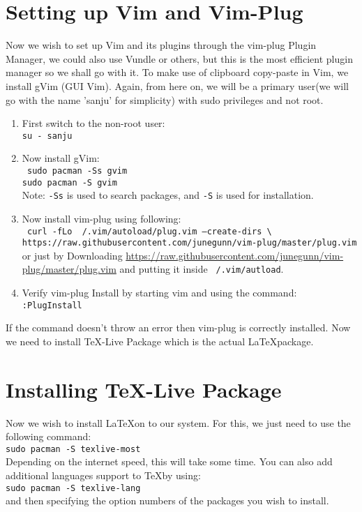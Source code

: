 \documentclass[11pt]{article}
\theoremstyle{plain}%
\theoremstyle{definition}
\theoremstyle{remark}
\begin{document}
	\section{Setting up Vim and Vim-Plug}
	Now we wish to set up Vim and its plugins through the vim-plug Plugin Manager, we could also use Vundle or others, but this is the most efficient plugin manager so we shall go with it. To make use of clipboard copy-paste in Vim, we install gVim (GUI Vim). Again, from here on, we will be a primary user(we will go with the name 'sanju' for simplicity) with sudo privileges and not root. 
	\begin{enumerate}
		\item First switch to the non-root user: \\
			\texttt{su - sanju}
		\item Now install gVim: \\
			\texttt{ sudo pacman -Ss gvim \\
			sudo pacman -S gvim}\\
		Note: \texttt{-Ss} is used to search packages, and \texttt{-S} is used for installation.
		\item Now install vim-plug using following: \\
			\texttt{
curl -fLo ~/.vim/autoload/plug.vim --create-dirs \textbackslash \\
    https://raw.githubusercontent.com/junegunn/vim-plug/master/plug.vim } \\
    or just by Downloading \url{https://raw.githubusercontent.com/junegunn/vim-plug/master/plug.vim} and putting it inside \texttt{~/.vim/autload}.
    		\item Verify vim-plug Install by starting vim and using the command: \\ 
			\texttt{:PlugInstall}
	\end{enumerate}
	If the command doesn't throw an error then vim-plug is correctly installed. Now we need to install \TeX-Live Package which is the actual \LaTeX package.
	\section{Installing \TeX-Live Package}
	Now we wish to install \LaTeX on to our system. For this, we just need to use the following command: \\
	\texttt{sudo pacman -S texlive-most}\\
	Depending on the internet speed, this will take some time. You can also add additional languages support to \TeX by using: \\
	\texttt{sudo pacman -S texlive-lang}\\
	and then specifying the option numbers of the packages you wish to install.
\end{document}
